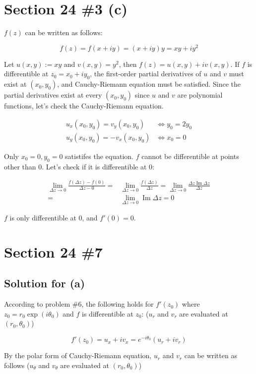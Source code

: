 \documentclass{scrartcl}
\begin{document}
\section{Section 24 \#3 (c)}
\(f(z)\) can be written as follows:

\[
  f(z) = f(x + iy) = (x + iy)y = xy + iy^2
\]

Let \(u(x, y) := xy\) and \(v(x, y) = y^2\), then \(f(z) = u(x, y) + iv(x, y)\).
If \(f\) is differentible at \(z_0 = x_0 + iy_0\), the first-order partial derivatives of \(u\) and \(v\) must exist at \((x_0, y_0)\), and Cauchy-Riemann equation must be satisfied.
Since the partial derivatives exist at every \((x_0, y_0)\) since \(u\) and \(v\) are polynomial functions, let's check the Cauchy-Riemann equation.

\begin{align*}
  u_x(x_0, y_0) = v_y(x_0, y_0) &\Longleftrightarrow y_0 = 2y_0 \\
  u_y(x_0, y_0) = -v_x(x_0, y_0) &\Longleftrightarrow x_0 = 0
\end{align*}

Only \(x_0 = 0, y_0 = 0\) satistifes the equation.
\(f\) cannot be differentible at points other than \(0\).
Let's check if it is differentible at \(0\):

\begin{align*}
  \lim_{\Delta z \to 0} \frac{f(\Delta z) - f(0)}{\Delta z - 0} =& \lim_{\Delta z \to 0} \frac{f(\Delta z)}{\Delta z} = \lim_{\Delta z \to 0} \frac{\Delta z \operatorname{Im} \Delta z}{\Delta z} \\
  =& \lim_{\Delta z \to 0} \operatorname{Im} \Delta z = 0
\end{align*}

\(f\) is only differentible at \(0\), and \(f'(0) = 0\).

\section{Section 24 \#7}
\subsection{Solution for (a)}
According to problem \#6, the following holds for \(f'(z_0)\) where \(z_0 = r_0\exp(i\theta_0)\) and \(f\) is differentible at \(z_0\): (\(u_r\) and \(v_r\) are evaluated at \((r_0, \theta_0)\))

\[
  f'(z_0) = u_x + iv_x = e^{-i\theta_0} (u_r + iv_r)
\]

By the polar form of Cauchy-Riemann equation, \(u_r\) and \(v_r\) can be written as follows (\(u_\theta\) and \(v_\theta\) are evaluated at \((r_0, \theta_0)\))
\end{document}
